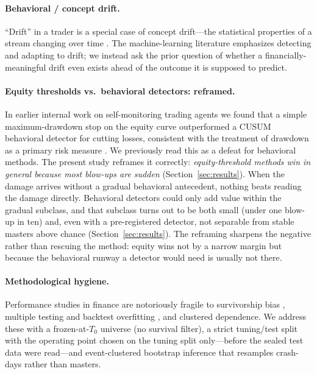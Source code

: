 \documentclass[11pt,a4paper]{article}
\newcommand{\Tnull}{T_{0}}
\begin{document}
\paragraph{Behavioral / concept drift.}
``Drift'' in a trader is a special case of concept drift---the statistical
properties of a stream changing over time \citep{gama2014concept}. The
machine-learning literature emphasizes detecting and adapting to drift; we instead
ask the prior question of whether a financially-meaningful drift even exists ahead
of the outcome it is supposed to predict.

\paragraph{Equity thresholds vs.\ behavioral detectors: reframed.}
In earlier internal work on self-monitoring trading agents we found that a simple
maximum-drawdown stop on the equity curve outperformed a CUSUM behavioral detector
for cutting losses, consistent with the treatment of drawdown as a primary risk
measure \citep{magdon2004maxdd}. We previously read this as a defeat for behavioral
methods. The present study reframes it correctly: \emph{equity-threshold methods
win in general because most blow-ups are sudden} (Section~\ref{sec:results}). When
the damage arrives without a gradual behavioral antecedent, nothing beats reading
the damage directly. Behavioral detectors could only add value within the gradual
subclass, and that subclass turns out to be both small (under one blow-up in ten)
and, even with a pre-registered detector, not separable from stable masters above
chance (Section~\ref{sec:results}). The reframing sharpens the negative rather than
rescuing the method: equity wins not by a narrow margin but because the behavioral
runway a detector would need is usually not there.

\paragraph{Methodological hygiene.}
Performance studies in finance are notoriously fragile to survivorship bias
\citep{brown1991survivorship}, multiple testing and backtest overfitting
\citep{harvey2015backtesting}, and clustered dependence. We address these with a
frozen-at-$\Tnull$ universe (no survival filter), a strict tuning/test split with
the operating point chosen on the tuning split only---before the sealed test data
were read---and event-clustered bootstrap
inference \citep{efron1986bootstrap,cameron2008clusterboot} that resamples
crash-days rather than masters.
\end{document}
